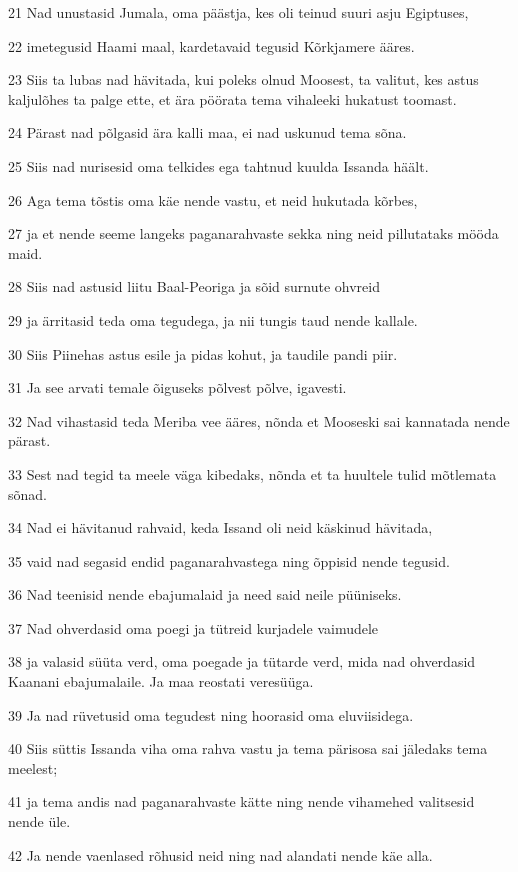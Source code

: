 \par 21 Nad unustasid Jumala, oma päästja, kes oli teinud suuri asju Egiptuses,
\par 22 imetegusid Haami maal, kardetavaid tegusid Kõrkjamere ääres.
\par 23 Siis ta lubas nad hävitada, kui poleks olnud Moosest, ta valitut, kes astus kaljulõhes ta palge ette, et ära pöörata tema vihaleeki hukatust toomast.
\par 24 Pärast nad põlgasid ära kalli maa, ei nad uskunud tema sõna.
\par 25 Siis nad nurisesid oma telkides ega tahtnud kuulda Issanda häält.
\par 26 Aga tema tõstis oma käe nende vastu, et neid hukutada kõrbes,
\par 27 ja et nende seeme langeks paganarahvaste sekka ning neid pillutataks mööda maid.
\par 28 Siis nad astusid liitu Baal-Peoriga ja sõid surnute ohvreid
\par 29 ja ärritasid teda oma tegudega, ja nii tungis taud nende kallale.
\par 30 Siis Piinehas astus esile ja pidas kohut, ja taudile pandi piir.
\par 31 Ja see arvati temale õiguseks põlvest põlve, igavesti.
\par 32 Nad vihastasid teda Meriba vee ääres, nõnda et Mooseski sai kannatada nende pärast.
\par 33 Sest nad tegid ta meele väga kibedaks, nõnda et ta huultele tulid mõtlemata sõnad.
\par 34 Nad ei hävitanud rahvaid, keda Issand oli neid käskinud hävitada,
\par 35 vaid nad segasid endid paganarahvastega ning õppisid nende tegusid.
\par 36 Nad teenisid nende ebajumalaid ja need said neile püüniseks.
\par 37 Nad ohverdasid oma poegi ja tütreid kurjadele vaimudele
\par 38 ja valasid süüta verd, oma poegade ja tütarde verd, mida nad ohverdasid Kaanani ebajumalaile. Ja maa reostati veresüüga.
\par 39 Ja nad rüvetusid oma tegudest ning hoorasid oma eluviisidega.
\par 40 Siis süttis Issanda viha oma rahva vastu ja tema pärisosa sai jäledaks tema meelest;
\par 41 ja tema andis nad paganarahvaste kätte ning nende vihamehed valitsesid nende üle.
\par 42 Ja nende vaenlased rõhusid neid ning nad alandati nende käe alla.
